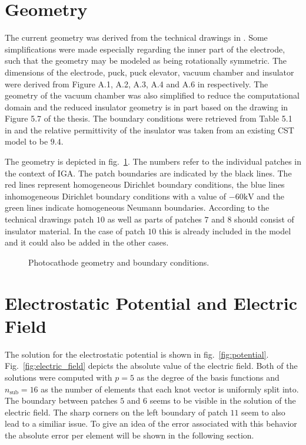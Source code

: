 \section{Geometry}
The current geometry was derived from the technical drawings in \cite{thesis}. Some simplifications were made especially regarding the inner part of the electrode, such that the geometry may be modeled as being rotationally symmetric. The dimensions of the electrode, puck, puck elevator, vacuum chamber and insulator were derived from Figure A.1, A.2, A.3, A.4 and A.6 in \cite{thesis} respectively. The geometry of the vacuum chamber was also simplified to reduce the computational domain and the reduced insulator geometry is in part based on the drawing in Figure 5.7 of the thesis.
The boundary conditions were retrieved from Table 5.1 in \cite{thesis} and the relative permittivity of the insulator was taken from an existing CST model to be $9.4$.

The geometry is depicted in fig.~\ref{fig:geometry}. The numbers refer to the individual patches in the context of IGA. The patch boundaries are indicated by the black lines. The red lines represent homogeneous Dirichlet boundary conditions, the blue lines inhomogeneous Dirichlet boundary conditions with a value of $-60 \mathrm{kV}$ and the green lines indicate homogeneous Neumann boundaries.
According to the technical drawings patch $10$ as well as parts of patches $7$ and $8$ should consist of insulator material. In the case of patch $10$ this is already included in the model and it could also be added in the other cases.

\begin{center}
\begin{figure}[H]
  
  \caption{Photocathode geometry and boundary conditions.}
  \label{fig:geometry}
\end{figure}
\end{center}

\section{Electrostatic Potential and Electric Field}
\label{sec:potential_field}
The solution for the electrostatic potential is shown in fig.~\ref{fig:potential}. Fig.~\ref{fig:electric_field} depicts the absolute value of the electric field.
Both of the solutions were computed with $p=5$ as the degree of the basis functions and $n_\mathrm{sub}=16$ as the number of elements that each knot vector is uniformly split into.
The boundary between patches $5$ and $6$ seems to be visible in the solution of the electric field. The sharp corners on the left boundary of patch $11$ seem to also lead to a similiar issue. To give an idea of the error associated with this behavior the absolute error per element will be shown in the following section.

